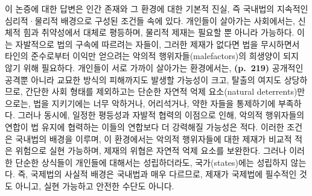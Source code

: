 이 논증에 대한 답변은 인간 존재와 그 환경에 대한 기본적 진실, 즉
국내법의 지속적인 심리적·물리적 배경으로 구성된 조건들 속에 있다.
개인들이 살아가는 사회에서는, 신체적 힘과 취약성에서 대체로 평등하며,
물리적 제재는 필요할 뿐 아니라 가능하다. 이는 자발적으로 법의 구속에
따르려는 자들이, 그러한 제재가 없다면 법을 무시하면서 타인의 준수로부터
이익만 얻으려는 악의적 행위자들(malefactors)의 희생양이 되지 않기 위해
필요하다. 개인들이 서로 가까이 살아가는 환경에서는, \textbf{(p.~219)}
공개적인 공격뿐 아니라 교묘한 방식의 피해까지도 발생할 가능성이 크고,
탈출의 여지도 상당하므로, 간단한 사회 형태를 제외하고는 단순한 자연적
억제 요소(natural deterrents)만으로는, 법을 지키기에는 너무 악하거나,
어리석거나, 약한 자들을 통제하기에 부족하다. 그러나 동시에, 일정한
평등성과 자발적 협력의 이점으로 인해, 악의적 행위자들의 연합이 법 유지에
협력하는 이들의 연합보다 더 강력해질 가능성은 적다. 이러한 조건은
국내법의 배경을 이루며, 이 환경에서는 악의적 행위자들에 대한 제재가
비교적 적은 위험으로 실현 가능하며, 제재의 위협은 자연적 억제 요소를
보완한다. 그러나 이러한 단순한 상식들이 개인들에 대해서는 성립하더라도,
국가(states)에는 성립하지 않는다. 즉, 국제법의 사실적 배경은 국내법과
매우 다르므로, 제재가 국제법에 필수적인 것도 아니고, 실현 가능하고
안전한 수단도 아니다.

